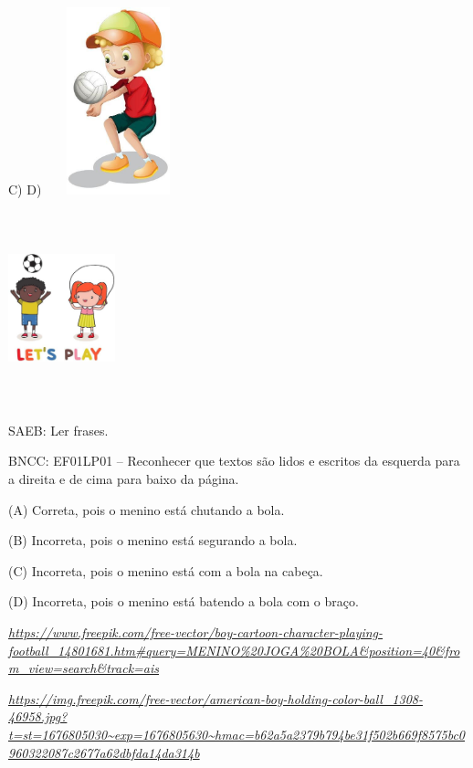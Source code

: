 C) D)
\includegraphics[width=1.65208in,height=2.13056in]{media/image201.jpg}

\includegraphics[width=1.21736in,height=2.20972in]{media/image202.jpg}

SAEB: Ler frases.

BNCC: EF01LP01 -- Reconhecer que textos são lidos e escritos da
esquerda para a direita e de cima para baixo da página.

(A) Correta, pois o menino está chutando a bola.

(B) Incorreta, pois o menino está segurando a bola.

(C) Incorreta, pois o menino está com a bola na cabeça.

(D) Incorreta, pois o menino está batendo a bola com o braço.

\href{https://www.freepik.com/free-vector/boy-cartoon-character-playing-football_14801681.htm\#query=MENINO\%20JOGA\%20BOLA\&position=40\&from_view=search\&track=ais}{\emph{https://www.freepik.com/free-vector/boy-cartoon-character-playing-football\_14801681.htm\#query=MENINO\%20JOGA\%20BOLA\&position=40\&from\_view=search\&track=ais}}

\href{https://img.freepik.com/free-vector/american-boy-holding-color-ball_1308-46958.jpg?t=st=1676805030~exp=1676805630~hmac=b62a5a2379b794be31f502b669f8575bc0960322087c2677a62dbfda14da314b}{\emph{https://img.freepik.com/free-vector/american-boy-holding-color-ball\_1308-46958.jpg?t=st=1676805030\textasciitilde{}exp=1676805630\textasciitilde{}hmac=b62a5a2379b794be31f502b669f8575bc0960322087c2677a62dbfda14da314b}}

